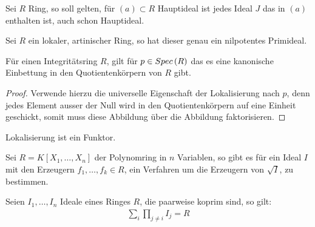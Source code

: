 \documentclass[ngerman, parskip=half, titlepage=false]{scrartcl}
\begin{document}
\begin{Beh}
  Sei $R$ Ring, so soll gelten, für $(a) \subset R$ Hauptideal ist jedes Ideal $J$
  das in $(a)$ enthalten ist, auch schon Hauptideal.
\end{Beh}

\begin{Lem}
  Sei $R$ ein lokaler, artinischer Ring, so hat dieser genau ein nilpotentes
  Primideal.
\end{Lem}

\begin{Beh}
  Für einen Integritätsring $R$, gilt für $p \in Spec \left( R \right)$ das es 
  eine kanonische Einbettung
  in den Quotientenkörpern von $R$ gibt.
  \begin{proof}
    Verwende hierzu die universelle Eigenschaft der Lokalisierung nach
    $p$, denn jedes Element ausser der Null wird in den Quotientenkörpern 
    auf eine Einheit geschickt, somit muss diese Abbildung über die
    Abbildung 
    faktorisieren.
  \end{proof}
\end{Beh}

\begin{Satz}
  Lokalisierung ist ein Funktor.
\end{Satz}

\begin{Beh}
  Sei $R=K[X_1,\ldots,X_n]$ der Polynomring in $n$ Variablen, so gibt es für
  ein Ideal $I$ mit den Erzeugern $f_1,\ldots,f_k \in R$, ein Verfahren
  um die Erzeugern von $\sqrt{I}$, zu bestimmen.
\end{Beh}

\begin{Lem}
  Seien $I_1,\ldots,I_n$ Ideale eines Ringes $R$, die paarweise koprim sind,
  so gilt: 
  \begin{gather*}
    \sum_i \prod_{j \neq i} I_j = R
  \end{gather*}
\end{Lem}
\end{document}

